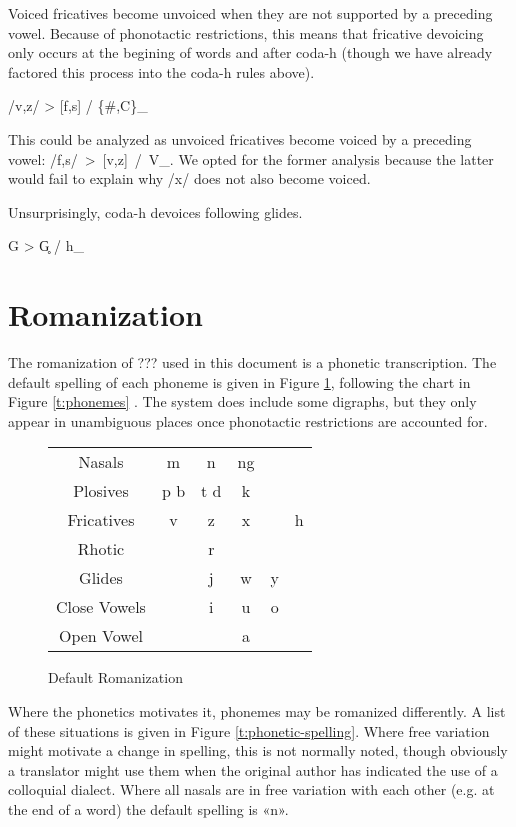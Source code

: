 \documentclass[12pt]{book} %
\begin{document}
Voiced fricatives become unvoiced when they are not supported by a preceding vowel.
Because of phonotactic restrictions, this means that fricative devoicing only occurs at the begining of words and after coda-h (though we have already factored this process into the coda-h rules above).
\begin{center}
/v,z/ > [f,s] / \{\#,C\}\_
\end{center}
This could be analyzed as unvoiced fricatives become voiced by a preceding vowel: /f,s/~>~[v,z]~/~V\_.
We opted for the former analysis because the latter would fail to explain why /x/ does not also become voiced.

Unsurprisingly, coda-h devoices following glides.
\begin{center}
    G > G̥ / h\_
\end{center}





\section{Romanization}

The romanization of ??? used in this document is a phonetic transcription.
The default spelling of each phoneme is given in Figure \ref{t:phoneme-spelling}, following the chart in Figure \ref{t:phonemes} .
The system does include some digraphs, but they only appear in unambiguous places once phonotactic restrictions are accounted for.

\begin{figure}[H]
\centering
    \begin{tabular}{cccccc}
    Nasals      &   m   & n     & ng            \\
    Plosives        &   p b & t d   & k         \\
    Fricatives  &   v   & z     & x &   & h \\
    Rhotic      &       & r                 \\
    Glides      &       & j     & w & y     \\
    Close Vowels    &       & i     & u & o     \\
    Open Vowel  &       &       & a &       \\
    \end{tabular}
\caption{Default Romanization}\label{t:phoneme-spelling}
\end{figure}

Where the phonetics motivates it, phonemes may be romanized differently.
A list of these situations is given in Figure \ref{t:phonetic-spelling}.
Where free variation might motivate a change in spelling, this is not normally noted, though obviously a translator might use them when the original author has indicated the use of a colloquial dialect.
Where all nasals are in free variation with each other (e.g. at the end of a word) the default spelling is «n».
\end{document}
